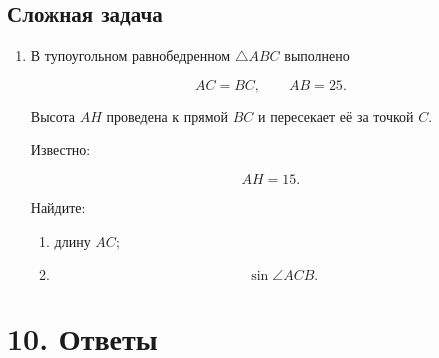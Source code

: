 \documentclass[a4paper,12pt]{article}
\begin{document}
\subsection{Сложная задача}

\begin{enumerate}[label=\textbf{\arabic*.},resume]

  \item
  В тупоугольном равнобедренном
  $\triangle ABC$ выполнено

  \[
  AC=BC,
  \qquad
  AB=25.
  \]

  Высота $AH$ проведена к прямой $BC$
  и пересекает её за точкой $C$.

  Известно:

  \[
  AH=15.
  \]

  Найдите:

  \begin{enumerate}[label=\alph*)]

    \item
    длину $AC$;

    \item
    \[
    \sin\angle ACB.
    \]

  \end{enumerate}

\end{enumerate}


\clearpage
\section{10. Ответы}
\end{document}
